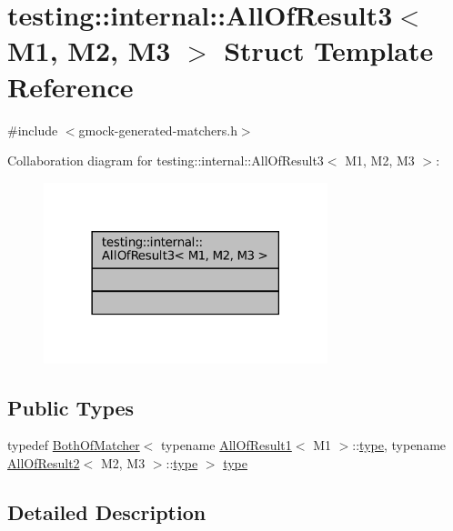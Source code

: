 \hypertarget{structtesting_1_1internal_1_1AllOfResult3}{}\section{testing\+:\+:internal\+:\+:All\+Of\+Result3$<$ M1, M2, M3 $>$ Struct Template Reference}
\label{structtesting_1_1internal_1_1AllOfResult3}


{\ttfamily \#include $<$gmock-\/generated-\/matchers.\+h$>$}



Collaboration diagram for testing\+:\+:internal\+:\+:All\+Of\+Result3$<$ M1, M2, M3 $>$\+:
\nopagebreak
\begin{figure}[H]
\begin{center}
\leavevmode
\includegraphics[width=234pt]{structtesting_1_1internal_1_1AllOfResult3__coll__graph}
\end{center}
\end{figure}
\subsection*{Public Types}
\begin{DoxyCompactItemize}
\item 
typedef \hyperlink{classtesting_1_1internal_1_1BothOfMatcher}{Both\+Of\+Matcher}$<$ typename \hyperlink{structtesting_1_1internal_1_1AllOfResult1}{All\+Of\+Result1}$<$ M1 $>$\+::\hyperlink{structtesting_1_1internal_1_1AllOfResult3_a18073a23acd542bccf3a6c5d7f72f957}{type}, typename \hyperlink{structtesting_1_1internal_1_1AllOfResult2}{All\+Of\+Result2}$<$ M2, M3 $>$\+::\hyperlink{structtesting_1_1internal_1_1AllOfResult3_a18073a23acd542bccf3a6c5d7f72f957}{type} $>$ \hyperlink{structtesting_1_1internal_1_1AllOfResult3_a18073a23acd542bccf3a6c5d7f72f957}{type}
\end{DoxyCompactItemize}


\subsection{Detailed Description}
